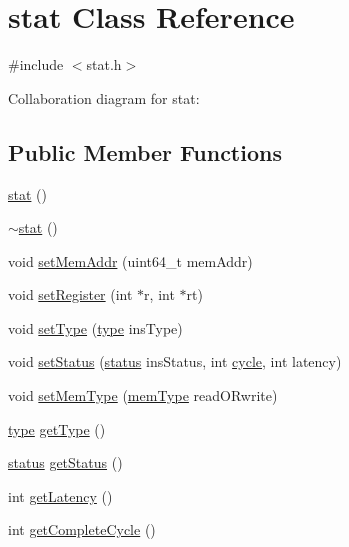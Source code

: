 \hypertarget{classstat}{
\section{stat Class Reference}
\label{classstat}
}


{\ttfamily \#include $<$stat.h$>$}



Collaboration diagram for stat:
\subsection*{Public Member Functions}
\begin{DoxyCompactItemize}
\item 
\hyperlink{classstat_ab89727a4198ffd032e194917596e156b}{stat} ()
\item 
\hyperlink{classstat_adb268824871b2f69d7b11003abf2fe6b}{$\sim$stat} ()
\item 
void \hyperlink{classstat_acaa589d5c6e90c0d7fe55ea5a80c39cd}{setMemAddr} (uint64\_\-t memAddr)
\item 
void \hyperlink{classstat_a534c0aacb73143316373470a70aece20}{setRegister} (int $\ast$r, int $\ast$rt)
\item 
void \hyperlink{classstat_aac993b5bfa99506a46b3bd02382613ed}{setType} (\hyperlink{binaryTranslator_2global_8h_a7aead736a07eaf25623ad7bfa1f0ee2d}{type} insType)
\item 
void \hyperlink{classstat_ac78f327016771d7189a0dd9e7709d7ce}{setStatus} (\hyperlink{global_2global_8h_a015eb90e0de9f16e87bd149d4b9ce959}{status} insStatus, int \hyperlink{vliwScheduler_8cpp_a1f4871d45089b039d95d3832dd123827}{cycle}, int latency)
\item 
void \hyperlink{classstat_ae3663029f693d0bd7279007a96b61fd1}{setMemType} (\hyperlink{binaryTranslator_2global_8h_a94b8423a23b95a7adac22848b81e7c0c}{memType} readORwrite)
\item 
\hyperlink{binaryTranslator_2global_8h_a7aead736a07eaf25623ad7bfa1f0ee2d}{type} \hyperlink{classstat_ad6c243f8915182cc7f3af301714cf6b2}{getType} ()
\item 
\hyperlink{global_2global_8h_a015eb90e0de9f16e87bd149d4b9ce959}{status} \hyperlink{classstat_af85423f8423fc110dc995e0da6d56f58}{getStatus} ()
\item 
int \hyperlink{classstat_a404f63a716c9853ebe824b2103ac6dbb}{getLatency} ()
\item 
int \hyperlink{classstat_adac51f4d495bd7bbfccd1f5c616a2a83}{getCompleteCycle} ()
\item 

\end{DoxyCompactItemize}
